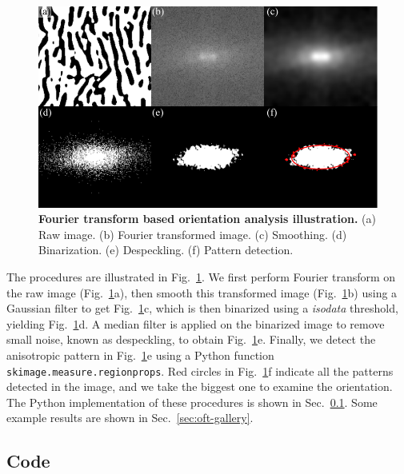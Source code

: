 \begin{figure}[h]
	\begin{center}
	\includegraphics[width=5.5in]{Figs/A-2/orientationFT.pdf}
	\end{center}
	\caption[Fourier transform based orientation analysis illustration]
	{
	\textbf{Fourier transform based orientation analysis illustration.}
  (a) Raw image.
  (b) Fourier transformed image.
  (c) Smoothing.
  (d) Binarization.
  (e) Despeckling.
  (f) Pattern detection.
	}
	\label{fig:oft-illustration}
\end{figure}

The procedures are illustrated in Fig.~\ref{fig:oft-illustration}. We first perform Fourier transform on the raw image (Fig.~\ref{fig:oft-illustration}a), then smooth this transformed image (Fig.~\ref{fig:oft-illustration}b) using a Gaussian filter to get Fig.~\ref{fig:oft-illustration}c, which is then binarized using a \emph{isodata} threshold, yielding Fig.~\ref{fig:oft-illustration}d. A median filter is applied on the binarized image to remove small noise, known as despeckling, to obtain Fig.~\ref{fig:oft-illustration}e. Finally, we detect the anisotropic pattern in Fig.~\ref{fig:oft-illustration}e using a Python function \texttt{skimage.measure.regionprops}. Red circles in Fig.~\ref{fig:oft-illustration}f indicate all the patterns detected in the image, and we take the biggest one to examine the orientation. The Python implementation of these procedures is shown in Sec.~\ref{sec:oft-code}. Some example results are shown in Sec.~\ref{sec:oft-gallery}.

\subsection{Code}
\label{sec:oft-code}

